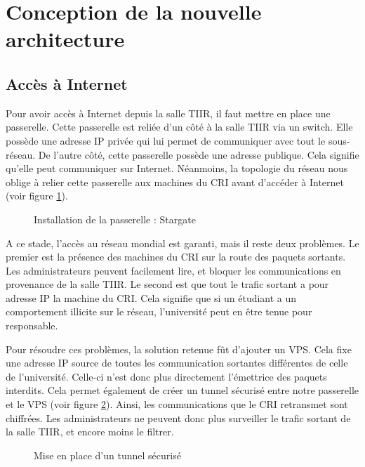\section{Conception de la nouvelle architecture}

\subsection{Accès à Internet}

Pour avoir accès à Internet depuis la salle TIIR, il faut mettre en place une passerelle. Cette passerelle est reliée d'un côté à la salle TIIR via un switch. Elle possède une adresse IP privée qui lui permet de communiquer avec tout le sous-réseau. De l'autre côté, cette passerelle possède une adresse publique. Cela signifie qu'elle peut communiquer sur Internet. Néanmoins, la topologie du réseau nous oblige à relier cette passerelle aux machines du CRI avant d'accéder à Internet (voir figure \ref{etape1}). 


\begin{figure}[!h]
\def\svgwidth{\columnwidth}

\caption{Installation de la passerelle : Stargate}
\label{etape1}
\end{figure}

A ce stade, l'accès au réseau mondial est garanti, mais il reste deux problèmes. Le premier est la présence des machines du CRI sur la route des paquets sortants. Les administrateurs peuvent facilement lire, et bloquer les communications en provenance de la salle TIIR. Le second est que tout le trafic sortant a pour adresse IP la machine du CRI. Cela signifie que si un étudiant a un comportement illicite sur le réseau, l'université peut en être tenue pour responsable.

Pour résoudre ces problèmes, la solution retenue fût d'ajouter un VPS. Cela fixe une adresse IP source de toutes les communication sortantes différentes de celle de l'université. Celle-ci n'est donc plus directement l'émettrice des paquets interdits. Cela permet également de créer un tunnel sécurisé entre notre passerelle et le VPS (voir figure \ref{etape2}). Ainsi, les communications que le CRI retransmet sont chiffrées. Les administrateurs ne peuvent donc plus surveiller le trafic sortant de la salle TIIR, et encore moins le filtrer.

\begin{figure}[!h]
\centering
\def\svgwidth{\columnwidth}

\caption{Mise en place d'un tunnel sécurisé}
\label{etape2}
\end{figure}

